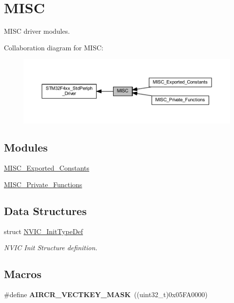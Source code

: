 \hypertarget{group___m_i_s_c}{}\section{M\+I\+SC}
\label{group___m_i_s_c}


M\+I\+SC driver modules.  


Collaboration diagram for M\+I\+SC\+:\nopagebreak
\begin{figure}[H]
\begin{center}
\leavevmode
\includegraphics[width=350pt]{group___m_i_s_c}
\end{center}
\end{figure}
\subsection*{Modules}
\begin{DoxyCompactItemize}
\item 
\hyperlink{group___m_i_s_c___exported___constants}{M\+I\+S\+C\+\_\+\+Exported\+\_\+\+Constants}
\item 
\hyperlink{group___m_i_s_c___private___functions}{M\+I\+S\+C\+\_\+\+Private\+\_\+\+Functions}
\end{DoxyCompactItemize}
\subsection*{Data Structures}
\begin{DoxyCompactItemize}
\item 
struct \hyperlink{struct_n_v_i_c___init_type_def}{N\+V\+I\+C\+\_\+\+Init\+Type\+Def}
\begin{DoxyCompactList}\small\item\em N\+V\+IC Init Structure definition. \end{DoxyCompactList}\end{DoxyCompactItemize}
\subsection*{Macros}
\begin{DoxyCompactItemize}
\item 
\mbox{\label{group___m_i_s_c_gad6905141fba3a2d8d5570db40805dc6a}} 
\#define {\bfseries A\+I\+R\+C\+R\+\_\+\+V\+E\+C\+T\+K\+E\+Y\+\_\+\+M\+A\+SK}~((uint32\+\_\+t)0x05\+F\+A0000)
\end{DoxyCompactItemize}
